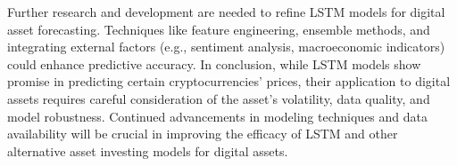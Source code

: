 Further research and development are needed to refine LSTM models for digital asset forecasting. Techniques like feature engineering, ensemble methods, and integrating external factors (e.g., sentiment analysis, macroeconomic indicators) could enhance predictive accuracy.
In conclusion, while LSTM models show promise in predicting certain cryptocurrencies' prices, their application to digital assets requires careful consideration of the asset's volatility, data quality, and model robustness. Continued advancements in modeling techniques and data availability will be crucial in improving the efficacy of LSTM and other alternative asset investing models for digital assets.